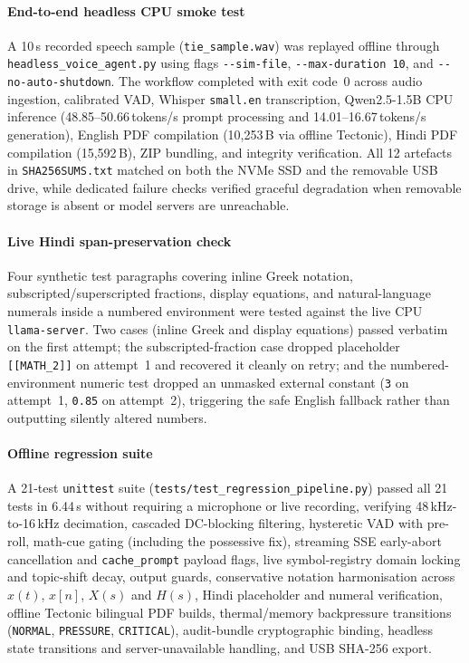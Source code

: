 \documentclass[11pt,a4paper,oneside]{report}
\theoremstyle{definition}
\newcommand{\code}[1]{\texttt{\small #1}}
\begin{document}
\paragraph{End-to-end headless CPU smoke test} A 10\,s recorded speech sample (\code{tie\_sample.wav}) was replayed offline through \code{headless\_voice\_agent.py} using flags \code{-{}-sim-file}, \code{-{}-max-duration 10}, and \code{-{}-no-auto-shutdown}. The workflow completed with exit code~0 across audio ingestion, calibrated VAD, Whisper \texttt{small.en} transcription, Qwen2.5-1.5B CPU inference (48.85--50.66\,tokens/s prompt processing and 14.01--16.67\,tokens/s generation), English PDF compilation (10{,}253\,B via offline Tectonic), Hindi PDF compilation (15{,}592\,B), ZIP bundling, and integrity verification. All 12 artefacts in \code{SHA256SUMS.txt} matched on both the NVMe SSD and the removable USB drive, while dedicated failure checks verified graceful degradation when removable storage is absent or model servers are unreachable.

\paragraph{Live Hindi span-preservation check} Four synthetic test paragraphs covering inline Greek notation, subscripted/superscripted fractions, display equations, and natural-language numerals inside a numbered environment were tested against the live CPU \code{llama-server}. Two cases (inline Greek and display equations) passed verbatim on the first attempt; the subscripted-fraction case dropped placeholder \code{[[MATH\_2]]} on attempt~1 and recovered it cleanly on retry; and the numbered-environment numeric test dropped an unmasked external constant (\code{3} on attempt~1, \code{0.85} on attempt~2), triggering the safe English fallback rather than outputting silently altered numbers.

\paragraph{Offline regression suite} A 21-test \code{unittest} suite (\code{tests/test\_regression\_pipeline.py}) passed all 21 tests in 6.44\,s without requiring a microphone or live recording, verifying 48\,kHz-to-16\,kHz decimation, cascaded DC-blocking filtering, hysteretic VAD with pre-roll, math-cue gating (including the possessive fix), streaming SSE early-abort cancellation and \code{cache\_prompt} payload flags, live symbol-registry domain locking and topic-shift decay, output guards, conservative notation harmonisation across $x(t)$, $x[n]$, $X(s)$ and $H(s)$, Hindi placeholder and numeral verification, offline Tectonic bilingual PDF builds, thermal/memory backpressure transitions (\code{NORMAL}, \code{PRESSURE}, \code{CRITICAL}), audit-bundle cryptographic binding, headless state transitions and server-unavailable handling, and USB SHA-256 export.
\end{document}
